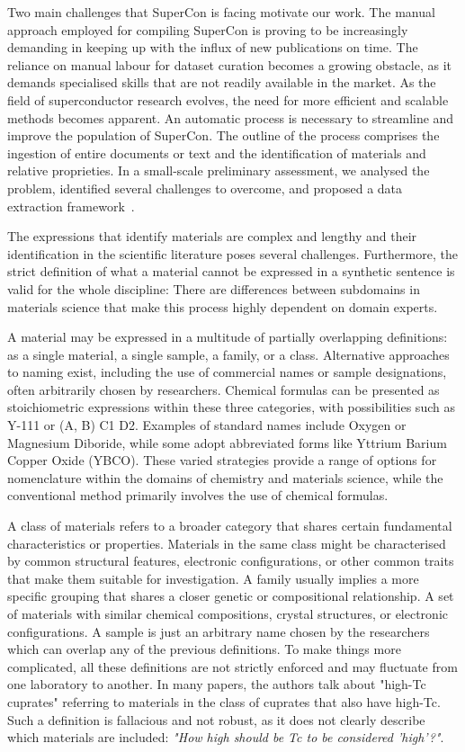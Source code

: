 Two main challenges that SuperCon is facing motivate our work. 
The manual approach employed for compiling SuperCon is proving to be increasingly demanding in keeping up with the influx of new publications on time. The reliance on manual labour for dataset curation becomes a growing obstacle, as it demands specialised skills that are not readily available in the market. As the field of superconductor research evolves, the need for more efficient and scalable methods becomes apparent.
An automatic process is necessary to streamline and improve the population of SuperCon. 
The outline of the process comprises the ingestion of entire documents or text and the identification of materials and relative proprieties.  
In a small-scale preliminary assessment, we analysed the problem, identified several challenges to overcome, and proposed a data extraction framework~\cite{foppiano2019proposal}.

The expressions that identify materials are complex and lengthy and their identification in the scientific literature poses several challenges.
Furthermore, the strict definition of what a material cannot be expressed in a synthetic sentence is valid for the whole discipline: There are differences between subdomains in materials science that make this process highly dependent on domain experts.

A material may be expressed in a multitude of partially overlapping definitions: as a single material, a single sample, a family, or a class.
Alternative approaches to naming exist, including the use of commercial names or sample designations, often arbitrarily chosen by researchers. Chemical formulas can be presented as stoichiometric expressions within these three categories, with possibilities such as Y-111 or (A, B) C1 D2. Examples of standard names include Oxygen or Magnesium Diboride, while some adopt abbreviated forms like Yttrium Barium Copper Oxide (YBCO). These varied strategies provide a range of options for nomenclature within the domains of chemistry and materials science, while the conventional method primarily involves the use of chemical formulas.

A class of materials refers to a broader category that shares certain fundamental characteristics or properties. Materials in the same class might be characterised by common structural features, electronic configurations, or other common traits that make them suitable for investigation. 
A family usually implies a more specific grouping that shares a closer genetic or compositional relationship. A set of materials with similar chemical compositions, crystal structures, or electronic configurations. 
A sample is just an arbitrary name chosen by the researchers which can overlap any of the previous definitions. 
To make things more complicated, all these definitions are not strictly enforced and may fluctuate from one laboratory to another. 
In many papers, the authors talk about "high-Tc cuprates" referring to materials in the class of cuprates that also have high-Tc. Such a definition is fallacious and not robust, as it does not clearly describe which materials are included: \textit{"How high should be Tc to be considered 'high'?"}.

